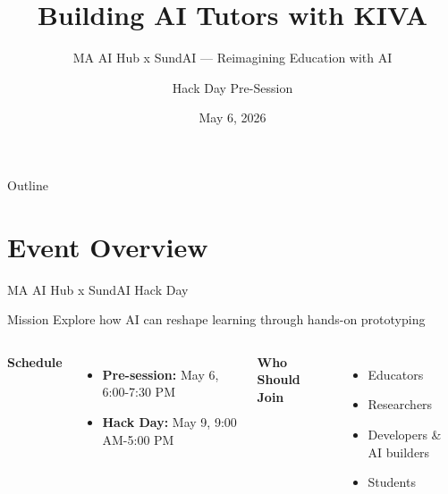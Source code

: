 \documentclass[aspectratio=169]{beamer}
\title[KIVA Pre-Session]{Building AI Tutors with KIVA}
\subtitle{MA AI Hub x SundAI — Reimagining Education with AI}
\author{Hack Day Pre-Session}
\date{May 6, 2026}
\institute{MIT AI Hub}
\begin{document}
\begin{frame}
\titlepage
\end{frame}

\begin{frame}{Outline}
\tableofcontents
\end{frame}

\section{Event Overview}

\begin{frame}{MA AI Hub x SundAI Hack Day}
\begin{block}{Mission}
Explore how AI can reshape learning through hands-on prototyping
\end{block}

\vspace{0.5cm}

\begin{columns}[T]
\textbf{Schedule}
\begin{itemize}
    \item \textcolor{kivablue}{\textbf{Pre-session:}} May 6, 6:00-7:30 PM
    \item \textcolor{kivagreen}{\textbf{Hack Day:}} May 9, 9:00 AM-5:00 PM
\end{itemize}

\textbf{Who Should Join}
\begin{itemize}
    \item Educators
    \item Researchers
    \item Developers \& AI builders
    \item Students
\end{itemize}
\end{columns}
\end{frame}
\end{document}
